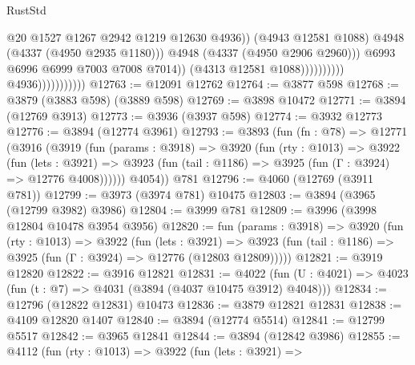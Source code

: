 \begin{lexlean}{RustStd}
\begin{coremodule}
                                                        @20
                                                        @1527
                                                        @1267
                                                        @2942
                                                        @1219
                                                        @12630
                                                        @4936))
                                                    (@4943 @12581 @1088)
                                                    @4948
                                                    (@4337 (@4950 @2935 @1180)))
                                                  @4948
                                                  (@4337 (@4950 @2906 @2960)))
                                                @6993
                                                @6996
                                                @6999
                                                @7003
                                                @7008
                                                @7014))
                                            (@4313 @12581 @1088))))))))))
                          @4936)))))))))))
@12763 := @12091 @12762
@12764 := @3877 @598
@12768 := @3879 (@3883 @598) (@3889 @598)
@12769 := @3898 @10472
@12771 := @3894 (@12769 @3913)
@12773 := @3936 (@3937 @598)
@12774 := @3932 @12773
@12776 := @3894 (@12774 @3961)
@12793 := @3893
    (fun (fn : @78) =>
    @12771
      (@3916
        (@3919
          (fun (params : @3918) =>
          @3920
            (fun (rty : @1013) =>
            @3922
              (fun (lets : @3921) =>
              @3923 (fun (tail : @1186) => @3925 (fun (Γ : @3924) => @12776 @4008))))))
        @4054))
    @781
@12796 := @4060 (@12769 (@3911 @781))
@12799 := @3973 (@3974 @781) @10475
@12803 := @3894 (@3965 (@12799 @3982) @3986)
@12804 := @3999 @781
@12809 := @3996 (@3998 @12804 @10478 @3954 @3956)
@12820 := fun (params : @3918) =>
  @3920
    (fun (rty : @1013) =>
    @3922
      (fun (lets : @3921) =>
      @3923 (fun (tail : @1186) => @3925 (fun (Γ : @3924) => @12776 (@12803 @12809)))))
@12821 := @3919 @12820
@12822 := @3916 @12821
@12831 := @4022
    (fun (U : @4021) => @4023 (fun (t : @7) => @4031 (@3894 (@4037 @10475 @3912) @4048)))
@12834 := @12796 (@12822 @12831) @10473
@12836 := @3879 @12821 @12831
@12838 := @4109 @12820 @1407
@12840 := @3894 (@12774 @5514)
@12841 := @12799 @5517
@12842 := @3965 @12841
@12844 := @3894 (@12842 @3986)
@12855 := @4112
    (fun (rty : @1013) =>
    @3922
      (fun (lets : @3921) =>

\end{coremodule}
\end{lexlean}
